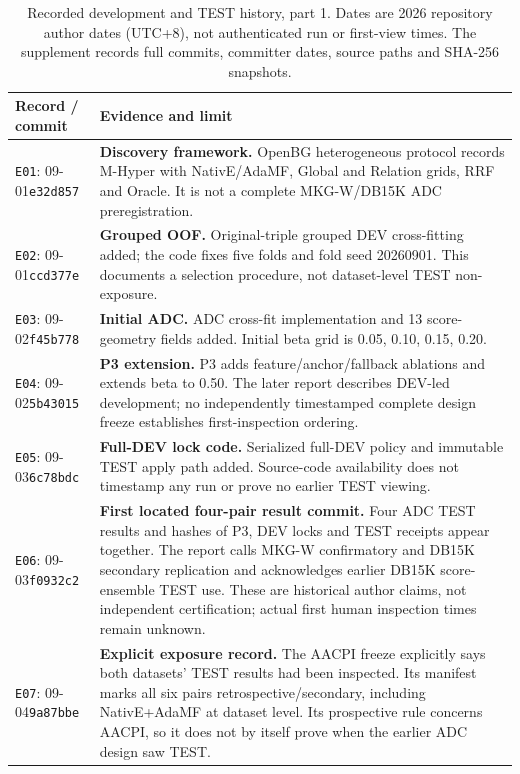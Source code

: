 \begin{table}[tbp]
\centering\footnotesize
\caption{Recorded development and TEST history, part 1. Dates are 2026 repository author dates (UTC+8), not authenticated run or first-view times. The supplement records full commits, committer dates, source paths and SHA-256 snapshots.}
\label{tab:history-1}
\begin{tabularx}{\linewidth}{@{}p{.15\linewidth}X@{}}
\toprule
Record / commit & Evidence and limit\\
\midrule
\texttt{E01}: 09-01\newline\texttt{e32d857} & \textbf{Discovery framework.} OpenBG heterogeneous protocol records M-Hyper with NativE/AdaMF, Global and Relation grids, RRF and Oracle. It is not a complete MKG-W/DB15K ADC preregistration.\\[3pt]
\texttt{E02}: 09-01\newline\texttt{ccd377e} & \textbf{Grouped OOF.} Original-triple grouped DEV cross-fitting added; the code fixes five folds and fold seed 20260901. This documents a selection procedure, not dataset-level TEST non-exposure.\\[3pt]
\texttt{E03}: 09-02\newline\texttt{f45b778} & \textbf{Initial ADC.} ADC cross-fit implementation and 13 score-geometry fields added. Initial beta grid is 0.05, 0.10, 0.15, 0.20.\\[3pt]
\texttt{E04}: 09-02\newline\texttt{5b43015} & \textbf{P3 extension.} P3 adds feature/anchor/fallback ablations and extends beta to 0.50. The later report describes DEV-led development; no independently timestamped complete design freeze establishes first-inspection ordering.\\[3pt]
\texttt{E05}: 09-03\newline\texttt{6c78bdc} & \textbf{Full-DEV lock code.} Serialized full-DEV policy and immutable TEST apply path added. Source-code availability does not timestamp any run or prove no earlier TEST viewing.\\[3pt]
\texttt{E06}: 09-03\newline\texttt{f0932c2} & \textbf{First located four-pair result commit.} Four ADC TEST results and hashes of P3, DEV locks and TEST receipts appear together. The report calls MKG-W confirmatory and DB15K secondary replication and acknowledges earlier DB15K score-ensemble TEST use. These are historical author claims, not independent certification; actual first human inspection times remain unknown.\\[3pt]
\texttt{E07}: 09-04\newline\texttt{9a87bbe} & \textbf{Explicit exposure record.} The AACPI freeze explicitly says both datasets' TEST results had been inspected. Its manifest marks all six pairs retrospective/secondary, including NativE+AdaMF at dataset level. Its prospective rule concerns AACPI, so it does not by itself prove when the earlier ADC design saw TEST.\\[3pt]
\bottomrule
\end{tabularx}
\end{table}
